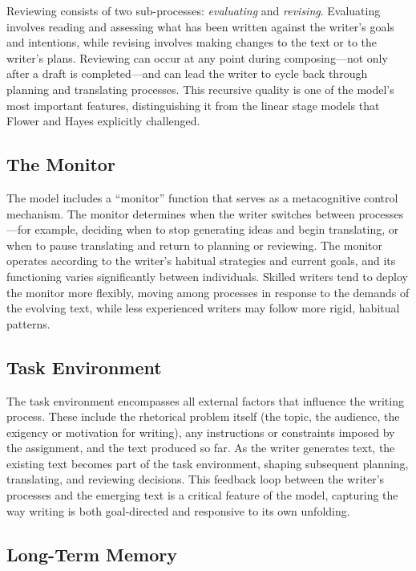 \documentclass[12pt]{article}
\begin{document}
Reviewing consists of two sub-processes: \textit{evaluating} and \textit{revising}. Evaluating involves reading and assessing what has been written against the writer's goals and intentions, while revising involves making changes to the text or to the writer's plans. Reviewing can occur at any point during composing---not only after a draft is completed---and can lead the writer to cycle back through planning and translating processes. This recursive quality is one of the model's most important features, distinguishing it from the linear stage models that Flower and Hayes explicitly challenged.

\subsection{The Monitor}

The model includes a ``monitor'' function that serves as a metacognitive control mechanism. The monitor determines when the writer switches between processes---for example, deciding when to stop generating ideas and begin translating, or when to pause translating and return to planning or reviewing. The monitor operates according to the writer's habitual strategies and current goals, and its functioning varies significantly between individuals. Skilled writers tend to deploy the monitor more flexibly, moving among processes in response to the demands of the evolving text, while less experienced writers may follow more rigid, habitual patterns.

\subsection{Task Environment}

The task environment encompasses all external factors that influence the writing process. These include the rhetorical problem itself (the topic, the audience, the exigency or motivation for writing), any instructions or constraints imposed by the assignment, and the text produced so far. As the writer generates text, the existing text becomes part of the task environment, shaping subsequent planning, translating, and reviewing decisions. This feedback loop between the writer's processes and the emerging text is a critical feature of the model, capturing the way writing is both goal-directed and responsive to its own unfolding.

\subsection{Long-Term Memory}
\end{document}
